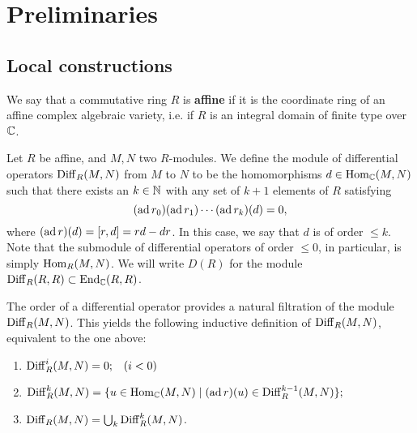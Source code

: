 \chapter{Preliminaries}


\section{Local constructions}

\begin{definition}
    We say that a commutative ring $R$ is \textbf{affine} if it is
    the coordinate ring of an affine complex algebraic variety, i.e.
    if $R$ is an integral domain of finite type over $\mathbb{C}$.
\end{definition}

\begin{definition}
    Let $R$ be affine, and $M,N$ two $R$-modules.
    We define the module of
    differential operators $\operatorname{Diff}_R(M,N)$ from $M$ to $N$ to be the homomorphisms $d\in\operatorname{Hom}_{\mathbb{C}}(M,N)$
    such that there exists an $k\in\mathbb{N}$ with any set of $k+1$ elements of $R$ satisfying
    \begin{equation}
        (\operatorname{ad} r_0)(\operatorname{ad} r_1)\cdots(\operatorname{ad} r_k)(d)=0,
        \label{eq:ad}
    \end{equation}
    where $(\operatorname{ad} r)(d)=[r,d]=rd-dr$. In this case, we say that $d$ is of order $\leqslant k$.
    Note that the submodule of differential operators of order $\leqslant 0$, in particular,
    is simply $\operatorname{Hom}_R(M,N)$. We will write $D(R)$ for the module $\operatorname{Diff}_R(R,R)\subset\operatorname{End}_{\mathbb{C}}(R,R)$.
    \label{def:derivations}
\end{definition}

\begin{remark}
    The order of a differential operator provides a natural filtration of the module $\operatorname{Diff}_R(M,N)$.
    This yields the following inductive definition of $\operatorname{Diff}_R(M,N)$, equivalent to the one
    above: %
    \begin{enumerate}
        \item[] $\operatorname{Diff}^{i}_R(M,N) = 0; \;\;\;(i<0)$
        \item[] $\operatorname{Diff}^k_R(M,N) = \{u\in\operatorname{Hom}_{\mathbb{C}}(M,N)\mid (\operatorname{ad} r)(u)\in \operatorname{Diff}^{k-1}_R(M,N)\};$
        \item[] $\operatorname{Diff}_R(M,N)=\bigcup_k\operatorname{Diff}^k_R(M,N)$.
    \end{enumerate}
\end{remark}

